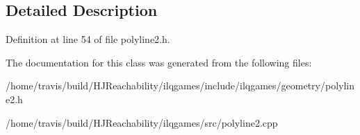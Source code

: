\subsection{Detailed Description}


Definition at line 54 of file polyline2.\+h.



The documentation for this class was generated from the following files\+:\begin{DoxyCompactItemize}
\item 
/home/travis/build/\+H\+J\+Reachability/ilqgames/include/ilqgames/geometry/polyline2.\+h\item 
/home/travis/build/\+H\+J\+Reachability/ilqgames/src/polyline2.\+cpp\end{DoxyCompactItemize}

